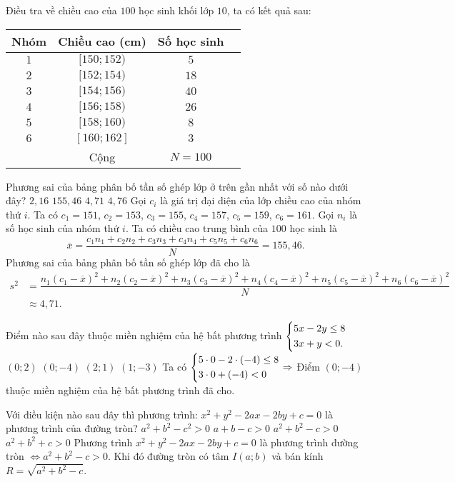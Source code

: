 \begin{ex}%
Điều tra về chiều cao của $100$ học sinh khối lớp $10$, ta có kết quả sau:
\begin{center}
\begin{tabular}{|c|c|c|c|}
\hline
Nhóm & Chiều cao (cm) & Số học sinh\\
\hline
	$1$ & $[150; 152)$ & $5$\\
\hline
	$2$ & $[152; 154)$ & $18$\\
\hline
	$3$ & $[154; 156)$ & $40$\\
\hline
	$4$ & $[156; 158)$ & $26$\\
\hline
	$5$ & $[158; 160)$ & $8$\\
\hline
	$6$ & $[160; 162]$ & $3$\\
\hline
	      &      Cộng       & $N=100$\\
\hline
	\end{tabular}
\end{center}
Phương sai của bảng phân bố tần số ghép lớp ở trên gần nhất với số nào dưới đây?
\choice
{$2{,}16$}
{$155{,}46$}
{\True $4{,}71$}
{$4{,}76$}
\loigiai
{Gọi $c_i$ là giá trị đại diện của lớp chiều cao của nhóm thứ $i$.
Ta có $c_1=151$, $c_2=153$, $c_3=155$, $c_4=157$, $c_5=159$, $c_6=161$.
Gọi $n_i$ là số học sinh của nhóm thứ $i$. Ta có chiều cao trung bình của $100$ học sinh là
$$\overline{x}=\dfrac{c_1n_1+c_2n_2+c_3n_3+c_4n_4+c_5n_5+c_6n_6}{N}=155{,}46.$$
Phương sai của bảng phân bố tần số ghép lớp đã cho là
$$
\begin{aligned}s^2&=\dfrac{n_1(c_1-\overline{x})^2+n_2(c_2-\overline{x})^2+n_3(c_3-\overline{x})^2+n_4(c_4-\overline{x})^2+n_5(c_5-\overline{x})^2
+n_6(c_6-\overline{x})^2}{N}\\
&\approx 4{,}71.
\end{aligned}$$
}
\end{ex}

\begin{ex}%
Điểm nào sau đây thuộc miền nghiệm của hệ bất phương trình $\left\{\begin{aligned}&5x-2y\leq 8\\&3x+y<0.\end{aligned}\right.$
\choice
{$(0; 2)$}
{\True $(0; -4)$}
{$(2; 1)$}
{$(1; -3)$}
\loigiai
{Ta có $\left\{\begin{aligned}&5\cdot 0-2\cdot (-4)\leq 8\\&3\cdot 0+(-4)<0\end{aligned}\right.\Rightarrow$ Điểm $(0; -4)$ thuộc miền nghiệm của hệ bất phương trình đã cho.
}
\end{ex}


\begin{ex}%
Với điều kiện nào sau đây thì phương trình: $x^2+y^2-2ax-2by+c=0$ là phương trình của đường tròn?
\choice
{$a^2+b^2-c^2>0$}
{$a+b-c>0$}
{\True $a^2+b^2-c>0$}
{$a^2+b^2+c>0$}
\loigiai
{Phương trình $x^2+y^2-2ax-2by+c=0$ là phương trình đường tròn $\Leftrightarrow a^2+b^2-c>0$. Khi đó đường tròn có tâm $I(a; b)$ và bán kính $R=\sqrt{a^2+b^2-c}$.
}
\end{ex}

